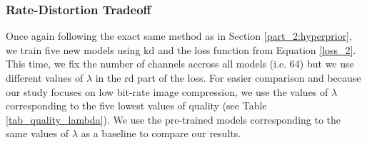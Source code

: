 \begin{figure}[H]
    \centering
    \qquad
    \caption[]{}
    \label{kd_lic_2}
\end{figure}

\subsubsection{Rate-Distortion Tradeoff}
Once again following the exact same method as in Section \ref{part_2:hyperprior}, we train five new models using \acrshort{kd} and the loss function from Equation \ref{loss_2}. This time, we fix the number of channels accross all models (i.e. 64) but we use different values of \(\lambda\) in the \acrshort{rd} part of the loss. For easier comparison and because our study focuses on low bit-rate image compression, we use the values of \(\lambda\) corresponding to the five lowest values of \textsf{quality} (see Table \ref{tab_quality_lambda}). We use the pre-trained models corresponding to the same values of \(\lambda\) as a baseline to compare our results.


